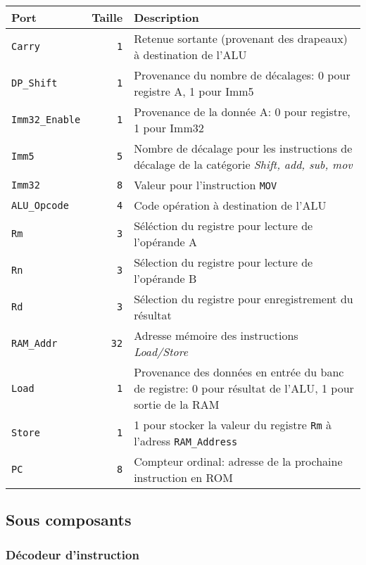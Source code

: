 \begin{tabular}{|l|r|l|}
\hline 
\textbf{Port} & \textbf{Taille} & \textbf{Description}\\
\hline

\hline
\texttt{Carry}		&  \texttt{1} & Retenue sortante (provenant des drapeaux) à destination de l'ALU\\
\hline
\texttt{DP\_Shift}	&  \texttt{1} & Provenance du nombre de décalages: 0 pour registre A, 1 pour Imm5 \\
\hline
\texttt{Imm32\_Enable}	&  \texttt{1} & Provenance de la donnée A: 0 pour registre, 1 pour Imm32\\
\hline
\texttt{Imm5}		&  \texttt{5} & Nombre de décalage pour les instructions de décalage de la catégorie \textit{Shift, add, sub, mov}\\
\hline
\texttt{Imm32}		&  \texttt{8} & Valeur pour l'instruction \texttt{MOV}\\
\hline
\texttt{ALU\_Opcode}	&  \texttt{4} & Code opération à destination de l'ALU\\
\hline
\texttt{Rm}		&  \texttt{3} & Séléction du registre pour lecture de l'opérande A\\
\hline
\texttt{Rn}		&  \texttt{3} & Sélection du registre pour lecture de l'opérande B\\
\hline
\texttt{Rd}		&  \texttt{3} & Sélection du registre pour enregistrement du résultat\\
\hline
\texttt{RAM\_Addr}	& \texttt{32} & Adresse mémoire des instructions \textit{Load/Store}\\
\hline
\texttt{Load}		&  \texttt{1} & Provenance des données en entrée du banc de registre: 0 pour résultat de l'ALU, 1 pour sortie de la RAM\\
\hline
\texttt{Store}		&  \texttt{1} & 1 pour stocker la valeur du registre \texttt{Rm} à l'adress \texttt{RAM\_Address}\\
\hline
\texttt{PC}		&  \texttt{8} & Compteur ordinal: adresse de la prochaine instruction en ROM\\


\hline
\end{tabular}

\subsection{Sous composants}

\subsubsection{Décodeur d'instruction}

